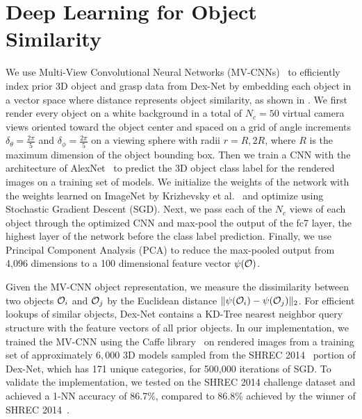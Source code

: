 \section{Deep Learning for Object Similarity}
We use Multi-View Convolutional Neural Networks (MV-CNNs)~\cite{su2015multi} to efficiently index prior 3D object and grasp data from Dex-Net by embedding each object in a vector space where distance represents object similarity, as shown in .
We first render every object on a white background in a total of $N_c = 50$ virtual camera views oriented toward the object center and spaced on a grid of angle increments $\delta_{\theta} = \frac{2 \pi}{5}$ and $\delta_{\phi} = \frac{2 \pi}{5}$ on a viewing sphere with radii $r = R, 2R$, where $R$ is the maximum dimension of the object bounding box.
Then we train a CNN with the architecture of AlexNet~\cite{krizhevsky2012imagenet} to predict the 3D object class label for the rendered images on a training set of models. 
We initialize the weights of the network with the weights learned on ImageNet by Krizhevsky et al.~\cite{krizhevsky2012imagenet} and optimize using Stochastic Gradient Descent (SGD). 
Next, we pass each of the $N_c$ views of each object through the optimized CNN and max-pool the output of the fc7 layer, the highest layer of the network before the class label prediction. 
Finally, we use Principal Component Analysis (PCA) to reduce the max-pooled output from 4,096 dimensions to a 100 dimensional feature vector $\psi(\mathcal{O})$.

Given the MV-CNN object representation, we measure the dissimilarity between two objects $\mathcal{O}_i$ and $\mathcal{O}_j$ by the Euclidean distance $\| \psi(\mathcal{O}_i) - \psi(\mathcal{O}_j) \|_2$.
For efficient lookups of similar objects, Dex-Net contains a KD-Tree nearest neighbor query structure with the feature vectors of all prior objects.
In our implementation, we trained the MV-CNN using the Caffe library~\cite{jia2014caffe} on rendered images from a training set of approximately $6,000$ 3D models sampled from the SHREC 2014~\cite{li2015comparison} portion of Dex-Net, which has 171 unique categories, for 500,000 iterations of SGD.
To validate the implementation, we tested on the SHREC 2014 challenge dataset and achieved a 1-NN accuracy of 86.7\%, compared to 86.8\% achieved by the winner of SHREC 2014~\cite{li2015comparison}.


